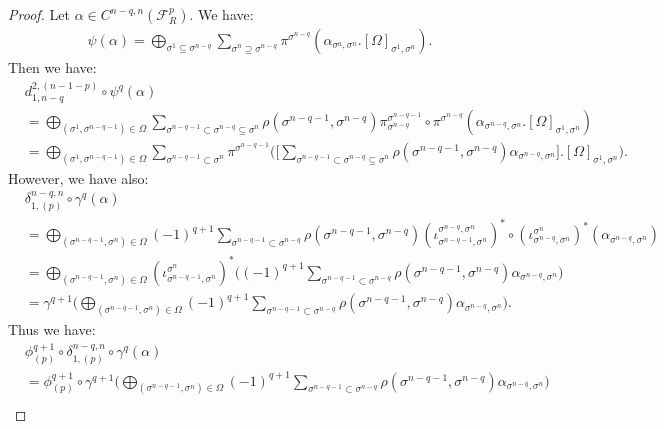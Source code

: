 \documentclass{article}
\begin{document}
\begin{proof}
    Let $\alpha \in C^{n-q,n}(\mathcal{F}_R^p)$. We have:
    \begin{align*}
        \psi(\alpha) = \bigoplus_{\sigma^1 \subseteq \sigma^{n-q}}\sum_{\sigma^n \supseteq \sigma^{n-q}} \pi^{\sigma^{n-q}}(\alpha_{\sigma^a,\sigma^n}.[\Omega]_{\sigma^1,\sigma^n}).
    \end{align*}
    Then we have:
    \begin{align*}
        &d^{2,(n-1-p)}_{1,n-q} \circ \psi^q(\alpha) \\&= \bigoplus_{(\sigma^1,\sigma^{n-q-1})\in\Omega}\sum_{\sigma^{n-q-1}\subset \sigma^{n-q}\subseteq \sigma^n}\rho(\sigma^{n-q-1},\sigma^{n-q})\pi_{\sigma^{n-q}}^{\sigma^{n-q-1}}\circ\pi^{\sigma^{n-q}}(\alpha_{\sigma^{n-q},\sigma^n}.[\Omega]_{\sigma^1,\sigma^n})
        \\& = \bigoplus_{(\sigma^1,\sigma^{n-q-1})\in\Omega}\sum_{\sigma^{n-q-1}\subset \sigma^{n}}\pi^{\sigma^{n-q-1}}\Bigg( \Bigg[
        \sum_{\sigma^{n-q-1}\subset \sigma^{n-q}\subseteq \sigma^n}\rho(\sigma^{n-q-1},\sigma^{n-q})\alpha_{\sigma^{n-q},\sigma^n}\Bigg].[\Omega]_{\sigma^1,\sigma^n}\Bigg).
    \end{align*}
    However, we have also:
    \begin{align*}
        &\delta^{n-q,n}_{1,(p)} \circ \gamma^q(\alpha) \\&= \bigoplus_{(\sigma^{n-q-1},\sigma^n)\in\Omega}(-1)^{q+1}\sum_{\sigma^{n-q-1} \subset \sigma^{n-q}} \rho(\sigma^{n-q-1},\sigma^{n-q})(\iota^{\sigma^{n-q},\sigma^n}_{\sigma^{n-q-1},\sigma^n})^*\circ (\iota^{\sigma^n}_{\sigma^{n-q},\sigma^n})^*(\alpha_{\sigma^{n-q},\sigma^n}) \\
        &= \bigoplus_{(\sigma^{n-q-1},\sigma^n)\in\Omega} (\iota^{\sigma^n}_{\sigma^{n-q-1},\sigma^n})^* \Bigg( (-1)^{q+1}\sum_{\sigma^{n-q-1} \subset \sigma^{n-q}}\rho(\sigma^{n-q-1},\sigma^{n-q})\alpha_{\sigma^{n-q},\sigma^n}\Bigg) \\
        &=\gamma^{q+1} \Bigg( \bigoplus_{(\sigma^{n-q-1},\sigma^n)\in\Omega} (-1)^{q+1}\sum_{\sigma^{n-q-1} \subset \sigma^{n-q}}\rho(\sigma^{n-q-1},\sigma^{n-q})\alpha_{\sigma^{n-q},\sigma^n} \Bigg).
    \end{align*}
    Thus we have:
    \begin{align*}
        &\phi^{q+1}_{(p)}\circ \delta^{n-q,n}_{1,(p)} \circ \gamma^q(\alpha) \\
        &=\phi^{q+1}_{(p)}\circ \gamma^{q+1} \Bigg( \bigoplus_{(\sigma^{n-q-1},\sigma^n)\in\Omega} (-1)^{q+1}\sum_{\sigma^{n-q-1} \subset \sigma^{n-q}}\rho(\sigma^{n-q-1},\sigma^{n-q})\alpha_{\sigma^{n-q},\sigma^n}\Bigg) \\

\end{align*}
\end{proof}
\end{document}
